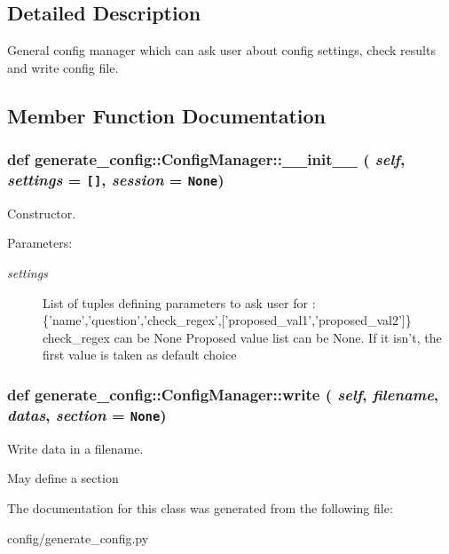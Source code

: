\subsection{Detailed Description}
General config manager which can ask user about config settings, check results and write config file. 

\subsection{Member Function Documentation}
\hypertarget{classgenerate__config_1_1ConfigManager_9d306a6d2e086a1dd9175423ad415798}{
\subsubsection[\_\-\_\-init\_\-\_\-]{\setlength{\rightskip}{0pt plus 5cm}def generate\_\-config::ConfigManager::\_\-\_\-init\_\-\_\- ( {\em self}, \/   {\em settings} = {\tt \mbox{[}\mbox{]}}, \/   {\em session} = {\tt None})}}
\label{classgenerate__config_1_1ConfigManager_9d306a6d2e086a1dd9175423ad415798}


Constructor. 

\begin{Desc}
\item[Parameters:]
\begin{description}
\item[{\em settings}]List of tuples defining parameters to ask user for : \{'name','question','check\_\-regex',\mbox{[}'proposed\_\-val1','proposed\_\-val2'\mbox{]}\} check\_\-regex can be None Proposed value list can be None. If it isn't, the first value is taken as default choice \end{description}
\end{Desc}
\hypertarget{classgenerate__config_1_1ConfigManager_50916dd9f4420c45c85048c3448dfd9e}{
\subsubsection[write]{\setlength{\rightskip}{0pt plus 5cm}def generate\_\-config::ConfigManager::write ( {\em self}, \/   {\em filename}, \/   {\em datas}, \/   {\em section} = {\tt None})}}
\label{classgenerate__config_1_1ConfigManager_50916dd9f4420c45c85048c3448dfd9e}


Write data in a filename. 

May define a section 

The documentation for this class was generated from the following file:\begin{CompactItemize}
\item 
config/generate\_\-config.py\end{CompactItemize}
